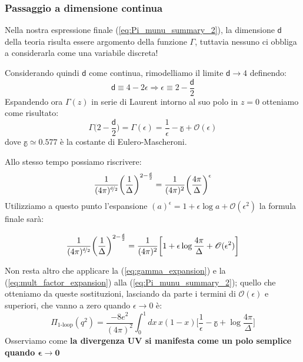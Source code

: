 \documentclass[../main.tex]{subfiles}
\begin{document}
\subsubsection{Passaggio a dimensione continua}

Nella nostra espressione finale (\ref{eq:Pi_munu_summary_2}), la dimensione $\mathsf d$ della teoria risulta essere argomento della funzione $\Gamma$, tuttavia nessuno ci obbliga a considerarla come una variabile discreta!

Considerando quindi $\mathsf d$ come continua, rimodelliamo il limite $\mathsf d \rightarrow 4$ definendo: 
\[
\mathsf d \equiv 4 - 2\epsilon \Rightarrow \epsilon \equiv 2 - \frac{\mathsf d}{2}
\]
Espandendo ora $\Gamma(z)$ in serie di Laurent intorno al suo polo in $z=0$ otteniamo come risultato:
\begin{equation}
\Gamma\bigl(2 - \frac{\mathsf d}{2}\bigr) = \Gamma(\epsilon) = \frac{1}{\epsilon}-\mathbb{\gamma}+\mathscr O(\epsilon)
\label{eq:gamma_expansion}
\end{equation}
dove $\mathbb{\gamma}\simeq0.577$ è la costante di Eulero-Mascheroni.

Allo stesso tempo possiamo riscrivere:
\[
\frac{1}{(4\pi)^{\nicefrac{\mathsf d}{2}}}\bigg(\frac{1}{\Delta}\bigg)^{ 2 - \frac{\mathsf d}{2}} = \frac{1}{(4\pi)^{2}}\bigg(\frac{4\pi}{\Delta}\bigg)^{ \epsilon} 
\]
Utilizziamo a questo punto l'espansione $(a)^\epsilon = 1+\epsilon\log{a} + \mathscr{O}(\epsilon^2)$ la formula finale sarà:

\begin{equation}
    \frac{1}{(4\pi)^{\nicefrac{\mathsf d}{2}}}\bigg(\frac{1}{\Delta}\bigg)^{ 2 - \frac{\mathsf d}{2}} = \frac{1}{(4\pi)^{2}}\bigg[1 + \epsilon\log{\frac{4\pi}{\Delta}} + \mathscr{O}(\epsilon^2) \bigg]
    \label{eq:mult_factor_expansion}
\end{equation}

Non resta altro che applicare la (\ref{eq:gamma_expansion}) e la (\ref{eq:mult_factor_expansion}) alla (\ref{eq:Pi_munu_summary_2}); quello che otteniamo da queste sostituzioni, lasciando da parte i termini di $\mathscr{O}(\epsilon)$ e superiori, che vanno a zero quando $\epsilon\rightarrow0$ è:
\begin{equation}
    \Pi_{\text{1-loop}}(q^2) = \frac{-8e^2}{ (4\pi)^2 } \int_0^1 dx\,x(1-x)\bigg[\frac{1}{\epsilon} - \mathbb{\gamma} + \log{\frac{4\pi}{\Delta}}\bigg]
    \label{eq:scalar_Pi_munu_expanded}
\end{equation}
Osserviamo come \textbf{la divergenza UV si manifesta come un polo semplice quando $\mathbf{\epsilon\rightarrow0}$}
\end{document}
